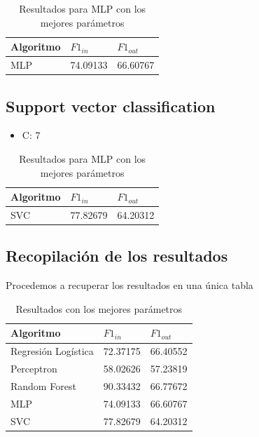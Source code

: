 \documentclass[11pt]{article}
\begin{document}
\begin{table}[h!]
    \centering
    \begin{tabular}{|l|l|l|}
    \hline
    Algoritmo    & $F1_{in}$  & $F1_{out}$ \\ \hline
    MLP   & 74.09133 & 66.60767 \\ \hline
    \end{tabular}
    \caption{Resultados para MLP con los mejores parámetros}
\end{table}

\subsection{Support vector classification}

\begin{itemize}
    \item C: 7
\end{itemize}

\begin{table}[h!]
    \centering
    \begin{tabular}{|l|l|l|}
    \hline
    Algoritmo    & $F1_{in}$  & $F1_{out}$ \\ \hline
    SVC   & 77.82679 & 64.20312 \\ \hline
    \end{tabular}
    \caption{Resultados para MLP con los mejores parámetros}
\end{table}


\subsection{Recopilación de los resultados}

Procedemos a recuperar los resultados en una única tabla

\begin{table}[H]
    \centering
    \begin{tabular}{|l|l|l|}
    \hline
    Algoritmo    & $F1_{in} $  & $F1_{out}$ \\ \hline
    Regresión Logística   & 72.37175  & 66.40552 \\ \hline
    Perceptron & 58.02626 & 57.23819 \\ \hline
    Random Forest   & 90.33432 & 66.77672 \\ \hline
    MLP   & 74.09133 & 66.60767 \\ \hline
    SVC   & 77.82679 & 64.20312 \\ \hline
    \end{tabular}
    \caption{Resultados con los mejores parámetros}
\end{table}
\end{document}
